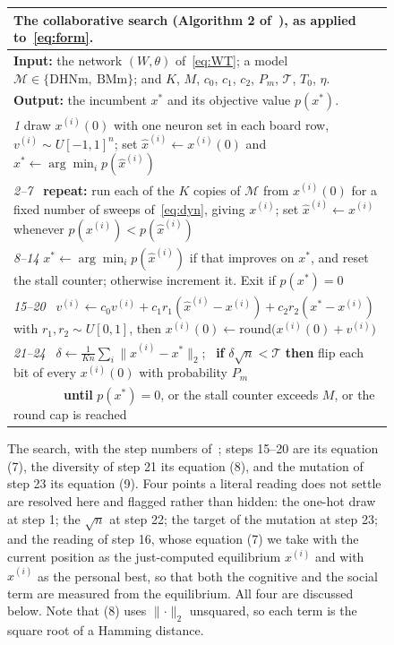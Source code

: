 \documentclass{easychair}
\newcommand{\citeref}[1]{\textcolor{academicpurple}{\cite{#1}}}
\begin{document}
\begin{figure}[H]
\centering\small
\setlength{\tabcolsep}{0pt}
\begin{tabular}{@{}p{}@{}}
\toprule
\textbf{The collaborative search} (Algorithm 2 of~\citeref{liwang2022}), as applied
to~\eqref{eq:form}.\\
\midrule
\textbf{Input:} the network $(W,\theta)$ of~\eqref{eq:WT}; a model $\mathcal{M} \in
\{\text{DHNm},\ \text{BMm}\}$; and $K$, $M$, $c_0$, $c_1$, $c_2$, $P_m$, $\mathcal{T}$, $T_0$,
$\eta$.\\
\textbf{Output:} the incumbent $x^{*}$ and its objective value $p(x^{*})$.\\
\midrule
\emph{1} \quad draw $x^{(i)}(0)$ with one neuron set in each board row, $v^{(i)} \sim U[-1,1]^{n}$;
set $\hat x^{(i)} \leftarrow x^{(i)}(0)$ and $x^{*} \leftarrow \arg\min_i p(\hat x^{(i)})$\\
\emph{2--7} \quad\, \textbf{repeat:} run each of the $K$ copies of $\mathcal{M}$ from $x^{(i)}(0)$
for a fixed number of sweeps of~\eqref{eq:dyn}, giving $x^{(i)}$; set
$\hat x^{(i)} \leftarrow x^{(i)}$ whenever $p(x^{(i)}) < p(\hat x^{(i)})$\\
\emph{8--14} \quad $x^{*} \leftarrow \arg\min_i p(\hat x^{(i)})$ if that improves on $x^{*}$, and
reset the stall counter; otherwise increment it. Exit if $p(x^{*}) = 0$\\
\emph{15--20} \, $v^{(i)} \leftarrow c_0 v^{(i)} + c_1 r_1 (\hat x^{(i)} - x^{(i)})
+ c_2 r_2 (x^{*} - x^{(i)})$ with $r_1, r_2 \sim U[0,1]$, then
$x^{(i)}(0) \leftarrow \mathrm{round}\bigl(x^{(i)}(0) + v^{(i)}\bigr)$\\
\emph{21--24} \, $\delta \leftarrow \frac{1}{Kn}\sum_i \lVert \hat x^{(i)} - x^{*}\rVert_2$;
\ \textbf{if} $\delta\sqrt{n} < \mathcal{T}$ \textbf{then} flip each bit of every $x^{(i)}(0)$ with
probability $P_m$\\
\quad\ \ \ \ \ \ \ \, \textbf{until} $p(x^{*}) = 0$, or the stall counter exceeds $M$, or the round
cap is reached\\
\bottomrule
\end{tabular}
\caption{The search, with the step numbers of~\citeref{liwang2022}; steps 15--20 are its equation
(7), the diversity of step 21 its equation (8), and the mutation of step 23 its equation (9). Four
points a literal reading does not settle are resolved here and flagged rather than hidden: the
one-hot draw at step 1; the $\sqrt{n}$ at step 22; the target of the mutation at step 23; and the
reading of step 16, whose equation (7) we take with the current position as the just-computed
equilibrium $x^{(i)}$ and with $\hat x^{(i)}$ as the personal best, so that both the cognitive and
the social term are measured from the equilibrium. All four are discussed below. Note that (8) uses
$\lVert\cdot\rVert_2$ unsquared, so each term is the square root of a Hamming
distance.}\label{fig:alg}
\end{figure}
\end{document}
